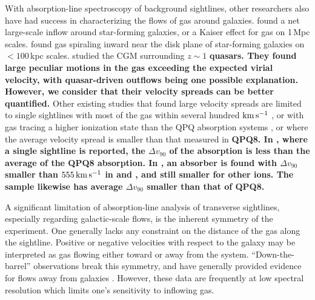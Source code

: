 \documentclass[iop]{emulateapj}
\begin{document}
With absorption-line spectroscopy of background sightlines, other researchers also have had 
success in characterizing the flows of gas around galaxies. \cite{Rakic+12} found a net 
large-scale inflow around star-forming galaxies, or a Kaiser effect for gas on 
1\,Mpc scales. \cite{Ho+17} found gas spiraling inward near the disk plane of 
star-forming galaxies on $<100$\,kpc scales. \cite{Johnson+15} studied the CGM surrounding 
$z\sim1$ {\bf quasars. They found large peculiar motions in the gas exceeding the expected virial
velocity, with quasar-driven outflows being one possible explanation. However, we consider that 
their velocity spreads can be better quantified.} Other
existing studies that found large velocity spreads are limited to single sightlines with most of 
the gas within several hundred ${\rm km\,s^{-1}}$ {\bf \citep[e.g., ][]{Tripp+11,RudieNewmanMurphy17}},
or with gas tracing 
a higher ionization state than the QPQ absorption systems \citep[e.g., ][]{Churchill+12}, or where 
the average velocity spread is smaller than that measured in {\bf QPQ8. In \cite{Gauthier13}, where a
single sightline is reported, the $\Delta v_{90}$ of the  absorption is less than the 
average of the QPQ8  absorption. In \cite{Muzahid+15}, an absorber is found with 
$\Delta v_{90}$ smaller than $555\,{\rm km\,s^{-1}}$ in  and , and still 
smaller for other ions. The \cite{Zahedy+16} sample likewise has average $\Delta v_{90}$ smaller 
than that of QPQ8.}

A significant limitation of absorption-line analysis of transverse sightlines, especially 
regarding galactic-scale flows, is the inherent symmetry of the experiment. One generally lacks 
any constraint on the distance of the gas along the sightline. Positive or negative velocities 
with respect to the galaxy may be interpreted as gas flowing either toward or away from the 
system. ``Down-the-barrel'' observations break this symmetry, and have generally provided evidence 
for flows away from galaxies \citep{Rupke+05,Martin05,Weiner+09,Rubin+14}. However, these data are 
frequently at low spectral resolution which limits one's sensitivity to inflowing gas. 
 
\end{document}
